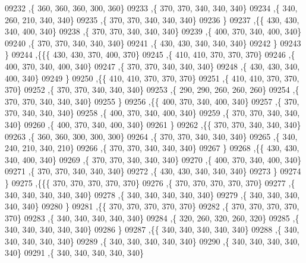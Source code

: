 \begin{DoxyCode}
09232     ,\{   360,   360,   360,   300,   360\}
09233     ,\{   370,   370,   340,   340,   340\}
09234     ,\{   340,   260,   210,   340,   340\}
09235     ,\{   370,   370,   340,   340,   340\}
09236     \}
09237    ,\{\{   430,   430,   340,   400,   340\}
09238     ,\{   370,   370,   340,   340,   340\}
09239     ,\{   400,   370,   340,   400,   340\}
09240     ,\{   370,   370,   340,   340,   340\}
09241     ,\{   430,   430,   340,   340,   340\}
09242     \}
09243    \}
09244   ,\{\{\{   430,   430,   370,   400,   370\}
09245     ,\{   410,   410,   370,   370,   370\}
09246     ,\{   400,   370,   340,   400,   340\}
09247     ,\{   370,   370,   340,   340,   340\}
09248     ,\{   430,   430,   340,   400,   340\}
09249     \}
09250    ,\{\{   410,   410,   370,   370,   370\}
09251     ,\{   410,   410,   370,   370,   370\}
09252     ,\{   370,   370,   340,   340,   340\}
09253     ,\{   290,   290,   260,   260,   260\}
09254     ,\{   370,   370,   340,   340,   340\}
09255     \}
09256    ,\{\{   400,   370,   340,   400,   340\}
09257     ,\{   370,   370,   340,   340,   340\}
09258     ,\{   400,   370,   340,   400,   340\}
09259     ,\{   370,   370,   340,   340,   340\}
09260     ,\{   400,   370,   340,   400,   340\}
09261     \}
09262    ,\{\{   370,   370,   340,   340,   340\}
09263     ,\{   360,   360,   300,   300,   300\}
09264     ,\{   370,   370,   340,   340,   340\}
09265     ,\{   340,   240,   210,   340,   210\}
09266     ,\{   370,   370,   340,   340,   340\}
09267     \}
09268    ,\{\{   430,   430,   340,   400,   340\}
09269     ,\{   370,   370,   340,   340,   340\}
09270     ,\{   400,   370,   340,   400,   340\}
09271     ,\{   370,   370,   340,   340,   340\}
09272     ,\{   430,   430,   340,   340,   340\}
09273     \}
09274    \}
09275   ,\{\{\{   370,   370,   370,   370,   370\}
09276     ,\{   370,   370,   370,   370,   370\}
09277     ,\{   340,   340,   340,   340,   340\}
09278     ,\{   340,   340,   340,   340,   340\}
09279     ,\{   340,   340,   340,   340,   340\}
09280     \}
09281    ,\{\{   370,   370,   370,   370,   370\}
09282     ,\{   370,   370,   370,   370,   370\}
09283     ,\{   340,   340,   340,   340,   340\}
09284     ,\{   320,   260,   320,   260,   320\}
09285     ,\{   340,   340,   340,   340,   340\}
09286     \}
09287    ,\{\{   340,   340,   340,   340,   340\}
09288     ,\{   340,   340,   340,   340,   340\}
09289     ,\{   340,   340,   340,   340,   340\}
09290     ,\{   340,   340,   340,   340,   340\}
09291     ,\{   340,   340,   340,   340,   340\}

\end{DoxyCode}

